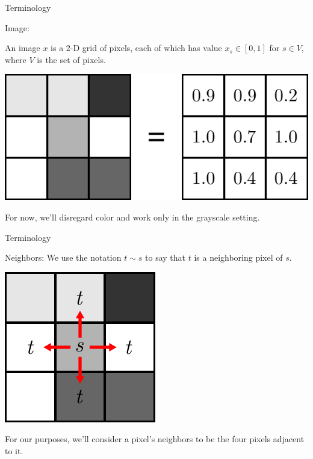 \documentclass[10pt]{beamer}
\begin{document}
\begin{frame}{Terminology}
\begin{block}{Image:}

An image $x$ is a 2-D grid of pixels, each of which has value $x_s \in [0, 1]$ for $s\in V$, where $V$ is the set of pixels.
\begin{center}
\includegraphics[scale=0.7]{img/lattice_def}
\end{center}
\end{block}

For now, we'll disregard color and work only in the grayscale setting.

\end{frame}

\begin{frame}{Terminology}
\begin{block}{Neighbors:}
We use the notation $t \sim s$ to say that $t$ is a neighboring pixel of $s$.

\begin{center}
\includegraphics[scale=0.7]{img/lattice_neighbors}
\end{center}
\end{block}

For our purposes, we'll consider a pixel's neighbors to be the four pixels adjacent to it.
\end{frame}
\end{document}
